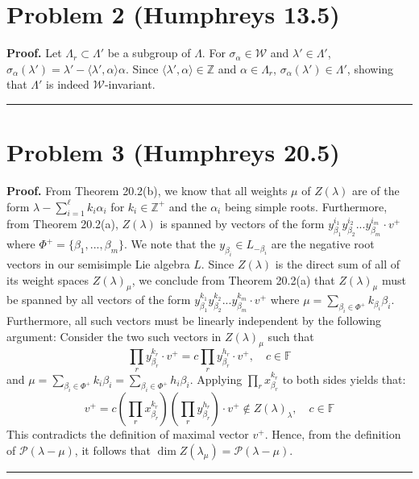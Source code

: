 \documentclass[12pt]{article}%
\newenvironment{proof}[1][Proof]{\textbf{#1.} }{\ \rule{0.5em}{0.5em}}
\begin{document}
\section*{Problem 2 (Humphreys 13.5)}
\begin{proof}
  Let $\Lambda_r \subset \Lambda'$ be a subgroup of $\Lambda$. For $\sigma_\alpha \in \mathcal{W}$ and $\lambda' \in \Lambda'$, $\sigma_{\alpha}(\lambda') = \lambda' - \langle \lambda',\alpha \rangle \alpha$. Since $\langle \lambda',\alpha \rangle \in \mathbb{Z}$ and $\alpha \in \Lambda_r$, $\sigma_{\alpha}(\lambda') \in \Lambda'$, showing that $\Lambda'$ is indeed $\mathcal{W}$-invariant.
\end{proof}

\section*{Problem 3 (Humphreys 20.5)}
\begin{proof}
 From Theorem 20.2(b), we know that all weights $\mu$ of $Z(\lambda)$ are of the form $\lambda - \sum_{i = 1}^{\ell} k_i \alpha_i$ for $k_{i} \in \mathbb{Z}^+$ and the $\alpha_i$ being simple roots. Furthermore, from Theorem 20.2(a), $Z(\lambda)$ is spanned by vectors of the form $y^{i_1}_{\beta_1}y^{i_2}_{\beta_2}...y^{i_m}_{\beta_m}\cdot v^+$ where $\Phi^+ = \{\beta_1,...,\beta_m\}$. We note that the $y_{\beta_i} \in L_{-\beta_i}$ are the negative root vectors in our semisimple Lie algebra $L$. Since $Z(\lambda)$ is the direct sum of all of its weight spaces $Z(\lambda)_{\mu}$, we conclude from Theorem 20.2(a) that $Z(\lambda)_{\mu}$ must be spanned by all vectors of the form $y_{\beta_1}^{k_1}y_{\beta_2}^{k_2}...y_{\beta_m}^{k_m}\cdot v^+$ where $\mu = \sum_{\beta_i \in \Phi^+}k_{\beta_i}\beta_i$. Furthermore, all such vectors must be linearly independent by the following argument:
 Consider the two such vectors in $Z(\lambda)_{\mu}$ such that
  $$\prod_r y^{k_r}_{\beta_r}\cdot v^+ = c\prod_r y^{h_r}_{\beta_r}\cdot v^+, \quad c \in \mathbb{F}$$
  and $\mu = \sum_{\beta_i \in {\Phi^+}} k_i \beta_i = \sum_{\beta_i \in {\Phi^+}} h_i \beta_i$. Applying $\prod_r x^{k_r}_{\beta_r}$ to both sides yields that:
  $$ v^+ = c (\prod_r x^{k_r}_{\beta_r})(\prod_r y^{h_r}_{\beta_r})\cdot v^+ \not\in Z(\lambda)_{\lambda}, \quad c \in \mathbb{F}  $$ This contradicts the definition of maximal vector $v^+$. Hence, from the definition of $\mathcal{P}(\lambda - \mu)$, it follows that $\dim{Z(\lambda_{\mu}) = \mathcal{P}(\lambda - \mu)}$.
\end{proof}
\end{document}

